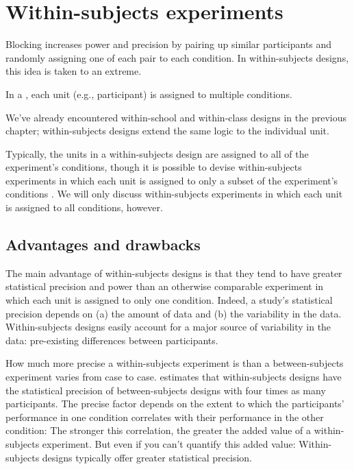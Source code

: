 \chapter{Within-subjects experiments}
Blocking increases power and precision by
pairing up similar participants and randomly assigning one of each pair to
each condition. In within-subjects designs, this idea is taken to an extreme.

  In a , each unit (e.g., participant)
  is assigned to multiple conditions.
\parend

We've already encountered within-school and within-class designs
in the previous chapter;
within-subjects designs extend the same logic to the individual unit.

Typically, the units in a within-subjects design are assigned to all
of the experiment's conditions, though it is possible to devise
within-subjects experiments in which each unit is assigned to
only a subset of the experiment's conditions
\citep[see][Section 7.3]{Senn2002}.
We will only discuss within-subjects experiments in which 
each unit is assigned to all conditions, however.

\section{Advantages and drawbacks}
The main advantage of within-subjects designs is 
that they tend to have greater statistical precision and power than an otherwise
comparable experiment in which each unit is assigned to only one condition.
Indeed, a study's statistical precision depends on
 (a) the amount of data and
 (b) the variability in the data. 
Within-subjects designs easily account for a major source of variability in the data:
pre-existing differences between participants.
 
How much more precise a within-subjects experiment is than a
between-subjects experiment varies from case to case.
\citet{Quene2010} 
estimates that within-subjects designs have the statistical precision
of between-subjects designs with four times as many participants.
The precise factor depends on the extent to which the participants'
performance in one condition correlates with their performance in the
other condition:
The stronger this correlation, the greater the added value of a
within-subjects experiment.
But even if you can't quantify this added value: 
Within-subjects designs typically offer greater statistical precision.
 
